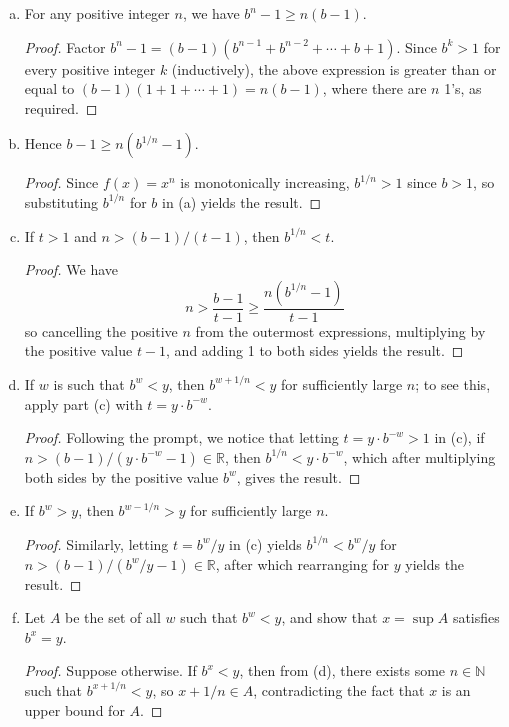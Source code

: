 \documentclass{scrbook}
\newcommand{\N}{\mathbb{N}}
\newcommand{\R}{\mathbb{R}}
\begin{document}
\begin{enumerate}
\begin{enumerate}[(a)]
\item For any positive integer $n$, we have $b^n - 1 \ge n(b - 1)$. 
\begin{proof}
Factor $b^n - 1 = (b - 1)(b^{n - 1} + b^{n - 2} + \dotsb + b + 1)$. Since $b^k > 1$ for every positive integer $k$ (inductively), the above expression is greater than or equal to $(b - 1)(1 + 1 + \dotsb + 1) = n(b - 1)$, where there are $n$ 1's, as required.
\end{proof}

\item Hence $b - 1 \ge n(b^{1/n} - 1)$.
\begin{proof}
Since $f(x) = x^n$ is monotonically increasing, $b^{1/n} > 1$ since $b > 1$, so substituting $b^{1/n}$ for $b$ in (a) yields the result.
\end{proof}

\item If $t > 1$ and $n > (b - 1)/(t - 1)$, then $b^{1/n} < t$.
\begin{proof}
We have 
\[
	n > \frac{b - 1}{t - 1} \ge \frac{n(b^{1/n} - 1)}{t - 1}
\]
so cancelling the positive $n$ from the outermost expressions, multiplying by the positive value $t - 1$, and adding 1 to both sides yields the result.
\end{proof}

\item If $w$ is such that $b^w < y$, then $b^{w + 1/n} < y$ for sufficiently large $n$; to see this, apply part (c) with $t = y \cdot b^{-w}$.
\begin{proof}
Following the prompt, we notice that letting $t = y \cdot b^{-w} > 1$ in (c), if $n > (b - 1)/(y \cdot b^{-w} - 1) \in \R$, then $b^{1/n} < y \cdot b^{-w}$, which after multiplying both sides by the positive value $b^w$, gives the result.
\end{proof}

\item If $b^w > y$, then $b^{w - 1/n} > y$ for sufficiently large $n$.
\begin{proof}
Similarly, letting $t = b^w / y$ in (c) yields $b^{1/n} < b^w / y$ for $n > (b - 1)/(b^w / y - 1) \in \R$, after which rearranging for $y$ yields the result. 
\end{proof}

\item Let $A$ be the set of all $w$ such that $b^w < y$, and show that $x = \sup A$ satisfies $b^x = y$.
\begin{proof}
Suppose otherwise. If $b^x < y$, then from (d), there exists some $n \in \N$ such that $b^{x + 1/n} < y$, so $x + 1/n \in A$, contradicting the fact that $x$ is an upper bound for $A$. 


\end{proof}
\end{enumerate}
\end{enumerate}
\end{document}
